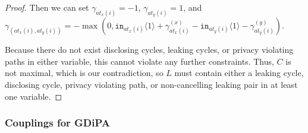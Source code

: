 \documentclass[12pt]{article}
\newcommand{\brangle}[1]{\langle #1 \rangle}
\theoremstyle{definition}
\begin{document}
\begin{proof}
    Then we can set $\gamma_{at_x(i)} = -1$, $\gamma_{at_y(i)}=1$, and $\gamma_{(at_x(i), at_y(i))} =  -\max(0, \texttt{in}_{at_x(i)}\brangle{1}+ \gamma_{at_x(i)}^{(x)}-\texttt{in}_{at_y(i)}\brangle{1}-\gamma_{at_y(i)}^{(y)})$. 
    
    Because there do not exist disclosing cycles, leaking cycles, or privacy violating paths in either variable, this cannot violate any further constraints. Thus, $C$ is not maximal, which is our contradiction, so $L$ must contain either a leaking cycle, disclosing cycle, privacy violating path, or non-cancelling leaking pair in at least one variable.
\end{proof}

\subsubsection{Couplings for GDiPA}
\end{document}
